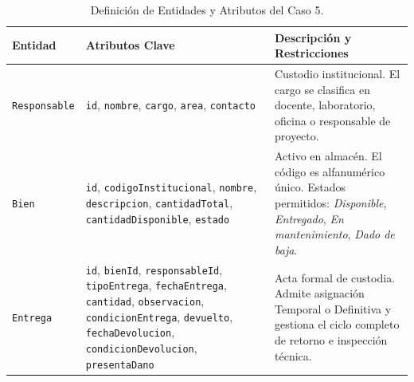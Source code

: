 \documentclass[12pt,a4paper]{article}
\begin{document}
\begin{table}[H]
\centering
\caption{Definición de Entidades y Atributos del Caso 5.}
\vspace{0.2cm}
\begin{tabularx}{\textwidth}{|l|l|X|}
\hline
\rowcolor[HTML]{E2E8F0} 
\textbf{Entidad} & \textbf{Atributos Clave} & \textbf{Descripción y Restricciones} \\ \hline
\texttt{Responsable} & \texttt{id}, \texttt{nombre}, \texttt{cargo}, \texttt{area}, \texttt{contacto} & Custodio institucional. El cargo se clasifica en docente, laboratorio, oficina o responsable de proyecto. \\ \hline
\texttt{Bien} & \texttt{id}, \texttt{codigoInstitucional}, \texttt{nombre}, \texttt{descripcion}, \texttt{cantidadTotal}, \texttt{cantidadDisponible}, \texttt{estado} & Activo en almacén. El código es alfanumérico único. Estados permitidos: \textit{Disponible}, \textit{Entregado}, \textit{En mantenimiento}, \textit{Dado de baja}. \\ \hline
\texttt{Entrega} & \texttt{id}, \texttt{bienId}, \texttt{responsableId}, \texttt{tipoEntrega}, \texttt{fechaEntrega}, \texttt{cantidad}, \texttt{observacion}, \texttt{condicionEntrega}, \texttt{devuelto}, \texttt{fechaDevolucion}, \texttt{condicionDevolucion}, \texttt{presentaDano} & Acta formal de custodia. Admite asignación Temporal o Definitiva y gestiona el ciclo completo de retorno e inspección técnica. \\ \hline
\end{tabularx}
\end{table}
\end{document}
